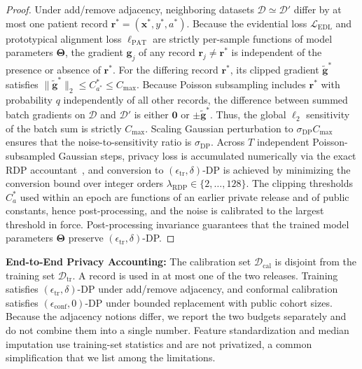 \documentclass[pdflatex,sn-vancouver-num,referee,lineno]{sn-jnl}
\theoremstyle{thmstyleone}
\theoremstyle{thmstylethree}
\begin{document}
\begin{proof}
Under add/remove adjacency, neighboring datasets $\mathcal{D} \simeq \mathcal{D}'$ differ by at most one patient record $\mathbf{r}^* = (\mathbf{x}^*, y^*, a^*)$. Because the evidential loss $\mathcal{L}_{\text{EDL}}$ and prototypical alignment loss $\ell_{\text{PAT}}$ are strictly per-sample functions of model parameters $\boldsymbol{\Theta}$, the gradient $\mathbf{g}_j$ of any record $\mathbf{r}_j \neq \mathbf{r}^*$ is independent of the presence or absence of $\mathbf{r}^*$. For the differing record $\mathbf{r}^*$, its clipped gradient $\tilde{\mathbf{g}}^*$ satisfies $\|\tilde{\mathbf{g}}^*\|_2 \le C_{a^*}^* \le C_{\max}$. Because Poisson subsampling includes $\mathbf{r}^*$ with probability $q$ independently of all other records, the difference between summed batch gradients on $\mathcal{D}$ and $\mathcal{D}'$ is either $\mathbf{0}$ or $\pm \tilde{\mathbf{g}}^*$. Thus, the global $\ell_2$ sensitivity of the batch sum is strictly $C_{\max}$. Scaling Gaussian perturbation to $\sigma_{\text{DP}} C_{\max}$ ensures that the noise-to-sensitivity ratio is $\sigma_{\text{DP}}$. Across $T$ independent Poisson-subsampled Gaussian steps, privacy loss is accumulated numerically via the exact RDP accountant~\cite{mironov2019renyi,wang2019subsampled}, and conversion to $(\epsilon_{\text{tr}}, \delta)$-DP is achieved by minimizing the conversion bound over integer orders $\lambda_{\text{RDP}} \in \{2,\dots,128\}$. The clipping thresholds $C_a^*$ used within an epoch are functions of an earlier private release and of public constants, hence post-processing, and the noise is calibrated to the largest threshold in force. Post-processing invariance guarantees that the trained model parameters $\boldsymbol{\Theta}$ preserve $(\epsilon_{\text{tr}}, \delta)$-DP.
\end{proof}

\noindent \textbf{End-to-End Privacy Accounting:} The calibration set $\mathcal{D}_{\text{cal}}$ is disjoint from the training set $\mathcal{D}_{\text{tr}}$. A record is used in at most one of the two releases. Training satisfies $(\epsilon_{\text{tr}}, \delta)$-DP under add/remove adjacency, and conformal calibration satisfies $(\epsilon_{\text{conf}}, 0)$-DP under bounded replacement with public cohort sizes. Because the adjacency notions differ, we report the two budgets separately and do not combine them into a single number. Feature standardization and median imputation use training-set statistics and are not privatized, a common simplification that we list among the limitations.
\end{document}
